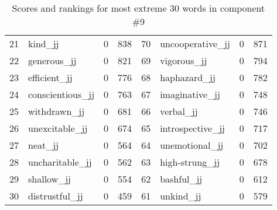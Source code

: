\begin{table}[tbp]
\begin{tabular}{| rlr@{.}l | rlr@{.}l |}
    21 & kind\_jj & 0 & 838    &    70 & uncooperative\_jj & 0 & 871 \\
    22 & generous\_jj & 0 & 821    &    69 & vigorous\_jj & 0 & 794 \\
    23 & efficient\_jj & 0 & 776    &    68 & haphazard\_jj & 0 & 782 \\
    24 & conscientious\_jj & 0 & 763    &    67 & imaginative\_jj & 0 & 748 \\
    25 & withdrawn\_jj & 0 & 681    &    66 & verbal\_jj & 0 & 746 \\
    26 & unexcitable\_jj & 0 & 674    &    65 & introspective\_jj & 0 & 717 \\
    27 & neat\_jj & 0 & 564    &    64 & unemotional\_jj & 0 & 702 \\
    28 & uncharitable\_jj & 0 & 562    &    63 & high-strung\_jj & 0 & 678 \\
    29 & shallow\_jj & 0 & 554    &    62 & bashful\_jj & 0 & 612 \\
    30 & distrustful\_jj & 0 & 459    &    61 & unkind\_jj & 0 & 579 \\
    \hline
    \end{tabular}
    \caption{Scores and rankings for most extreme 30 words in component \#9} 
\end{table}
\clearpage
